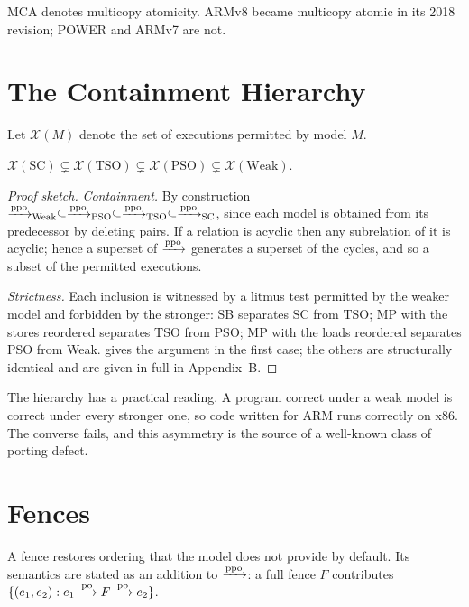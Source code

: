 \noindent MCA denotes multicopy atomicity. ARMv8 became multicopy atomic in its
2018 revision; POWER and ARMv7 are not.

\section{The Containment Hierarchy}
\label{sec:containment}

Let $\mathcal{X}(M)$ denote the set of executions permitted by model $M$.

\begin{theorem}[Containment]
\label{thm:containment}
$\mathcal{X}(\mathrm{SC}) \subsetneq \mathcal{X}(\mathrm{TSO}) \subsetneq
 \mathcal{X}(\mathrm{PSO}) \subsetneq \mathcal{X}(\mathrm{Weak})$.
\end{theorem}

\begin{proof}[Proof sketch]
\emph{Containment.} By construction $\xrightarrow{\text{ppo}}_{\mathrm{Weak}} \subseteq
\xrightarrow{\text{ppo}}_{\mathrm{PSO}} \subseteq \xrightarrow{\text{ppo}}_{\mathrm{TSO}} \subseteq \xrightarrow{\text{ppo}}_{\mathrm{SC}}$,
since each model is obtained from its predecessor by deleting pairs.
If a relation
is acyclic then any subrelation of it is acyclic; hence a superset of $\xrightarrow{\text{ppo}}$
generates a superset of the cycles, and so a subset of the permitted executions.

\emph{Strictness.} Each inclusion is witnessed by a litmus test permitted by the
weaker model and forbidden by the stronger: SB separates SC from TSO; MP with the
stores reordered separates TSO from PSO; MP with the loads reordered separates PSO
from Weak.
 gives the argument in the first case; the others
are structurally identical and are given in full in Appendix~B.
\end{proof}

The hierarchy has a practical reading.
A program correct under a weak model is
correct under every stronger one, so code written for ARM runs correctly on x86.
The converse fails, and this asymmetry is the source of a well-known class of
porting defect.

\section{Fences}
\label{sec:fences}

A fence restores ordering that the model does not provide by default.
Its
semantics are stated as an addition to $\xrightarrow{\text{ppo}}$: a full fence $F$ contributes
$\{(e_1,e_2) : e_1 \xrightarrow{\text{po}} F \xrightarrow{\text{po}} e_2\}$.

